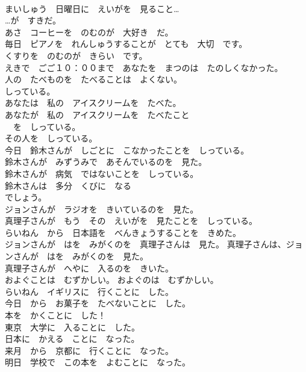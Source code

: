 \documentclass[8pt]{extreport}
\begin{document}
\begin{CJK}{UTF8}{min}
\\	まいしゅう　日曜日に　えいがを　見ること…	
\\	…が　すきだ。	
\\	あさ　コーヒーを　のむのが　大好き　だ。	
\\	毎日　ピアノを　れんしゅうすることが　とても　大切　です。	
\\	くすりを　のむのが　きらい　です。	
\\	えきで　ごご１０：００まで　あなたを　まつのは　たのしくなかった。	
\\	人の　たべものを　たべることは　よくない。	
\\	しっている。	
\\	あなたは　私の　アイスクリームを　たべた。	
\\	あなたが　私の　アイスクリームを　たべたこと	
\\	[あなたが　私の　アイスクリームを　たべたこと]　を　しっている。	
\\	その人を　しっている。	
\\	今日　鈴木さんが　しごとに　こなかったことを　しっている。	
\\	鈴木さんが　みずうみで　あそんでいるのを　見た。	
\\	鈴木さんが　病気　ではないことを　しっている。	
\\	鈴木さんは　多分　くびに　なる
\\	でしょう。	
\\	ジョンさんが　ラジオを　きいているのを　見た。	
\\	真理子さんが　もう　その　えいがを　見たことを　しっている。	
\\	らいねん　から　日本語を　べんきょうすることを　きめた。	
\\	ジョンさんが　はを　みがくのを　真理子さんは　見た。 真理子さんは、ジョンさんが　はを　みがくのを　見た。	
\\	真理子さんが　へやに　入るのを　きいた。	
\\	およぐことは　むずかしい。 およぐのは　むずかしい。	
\\	らいねん　イギリスに　行くことに　した。	
\\	今日　から　お菓子を　たべないことに　した。	
\\	本を　かくことに　した！	
\\	東京　大学に　入ることに　した。	
\\	日本に　かえる　ことに　なった。	
\\	来月　から　京都に　行くことに　なった。	
\\	明日　学校で　この本を　よむことに　なった。	

\end{CJK}
\end{document}
